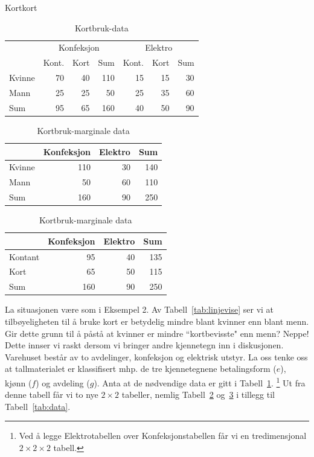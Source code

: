 \begin{eksempel}{Kortkort}
\begin{table}[ht] \centering 
\begin{tabular}{l|rr|r|rr|r}
  &\multicolumn{3}{c|}{Konfeksjon} &\multicolumn{3}{c}{Elektro}\\ \cline{2-7}
           &      Kont. & Kort & Sum   &   Kont. & Kort & Sum  \\  \hline
Kvinne     &       70   &   40  & 110   &    15   &   15  &  30  \\
Mann       &       25   &   25  &  50   &    25   &   35  &  60  \\  \hline
Sum        &       95   &   65  & 160   &    40   &   50  &  90  \\  \hline
\end{tabular}
\caption{Kortbruk-data}
\label{tab:kortbruk} %
\end{table}

\begin{table}[ht] \centering
\begin{tabular}{l|rr|r}
          &   Konfeksjon  &  Elektro   &   Sum  \\  \hline
Kvinne    &       110     &     30     &   140  \\
Mann      &        50     &     60     &   110  \\  \hline
Sum       &       160     &     90     &   250  \\  \hline
\end{tabular}
\caption{Kortbruk-marginale data}
\label{tab:kortbruk_marginal_kjonn} %
\end{table}

\begin{table}[h] \centering 
\begin{tabular}{l|rr|r}
          &   Konfeksjon  &  Elektro   &   Sum  \\  \hline
Kontant   &       95      &     40     &   135  \\ 
Kort      &       65      &     50     &   115  \\  \hline
Sum       &      160      &     90     &   250  \\  \hline
\end{tabular}
\caption{Kortbruk-marginale data}
\label{tab:kortbruk_marginal} %
\end{table}
La situasjonen være som i Eksempel 2.  Av Tabell~\ref{tab:linjevise} ser vi at 
tilbøyeligheten til å bruke kort er betydelig mindre blant kvinner
enn blant menn.  Gir dette grunn til å påstå at kvinner er
mindre ``kortbevisste" enn menn?  Neppe!  Dette innser vi raskt dersom
vi bringer andre kjennetegn inn i diskusjonen.  Varehuset består av
to avdelinger, konfeksjon og elektrisk utstyr.  La oss tenke oss at
tallmaterialet er klassifisert mhp. de tre kjennetegnene betalingsform
($e$), kjønn ($f$) og avdeling ($g$).  Anta at de nødvendige 
data er gitt i Tabell~\ref{tab:kortbruk}.  \footnote{Ved å legge Elektrotabellen
over Konfeksjonstabellen får vi en tredimensjonal $2\times 2\times 2$ 
tabell.}
Ut fra denne tabell får vi to nye $2\times 2$ tabeller, nemlig
Tabell~\ref{tab:kortbruk_marginal_kjonn} og~\ref{tab:kortbruk_marginal} 
i tillegg til Tabell~\ref{tab:data}.


\end{eksempel}
